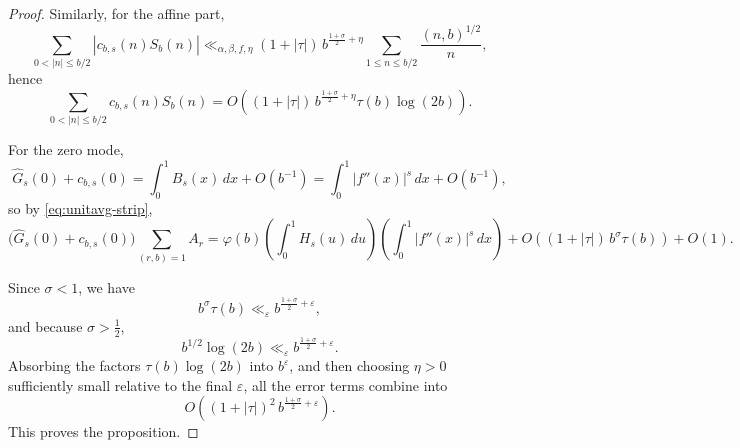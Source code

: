 \documentclass[10pt,a4paper]{amsart}
\begin{document}
\begin{proof}
Similarly, for the affine part,
\[
\sum_{0<|n|\le b/2}|c_{b,s}(n)S_b(n)|
\ll_{\alpha,\beta,f,\eta}
(1+|\tau|)\,b^{\frac{1+\sigma}{2}+\eta}
\sum_{1\le n\le b/2}\frac{(n,b)^{1/2}}{n},
\]
hence
\[
\sum_{0<|n|\le b/2}c_{b,s}(n)S_b(n)
=
O\!\left((1+|\tau|)\,b^{\frac{1+\sigma}{2}+\eta}\tau(b)\log(2b)\right).
\]

For the zero mode,
\[
\widehat G_s(0)+c_{b,s}(0)
=
\int_0^1 B_s(x)\,dx+O(b^{-1})
=
\int_0^1 |f''(x)|^s\,dx+O(b^{-1}),
\]
so by \eqref{eq:unitavg-strip},
\[
\bigl(\widehat G_s(0)+c_{b,s}(0)\bigr)\sum_{(r,b)=1}A_r
=
\varphi(b)\left(\int_0^1 H_s(u)\,du\right)\left(\int_0^1 |f''(x)|^s\,dx\right)
+
O\!\left((1+|\tau|)\,b^\sigma\tau(b)\right)
+
O(1).
\]

Since \(\sigma<1\), we have
\[
b^\sigma\tau(b)\ll_\varepsilon b^{\frac{1+\sigma}{2}+\varepsilon},
\]
and because \(\sigma>\tfrac12\),
\[
b^{1/2}\log(2b)\ll_\varepsilon b^{\frac{1+\sigma}{2}+\varepsilon}.
\]
Absorbing the factors \(\tau(b)\log(2b)\) into \(b^\varepsilon\), and then choosing \(\eta>0\)
sufficiently small relative to the final \(\varepsilon\), all the error terms combine into
\[
O\!\left((1+|\tau|)^2\,b^{\frac{1+\sigma}{2}+\varepsilon}\right).
\]
This proves the proposition.
\end{proof}
\end{document}
